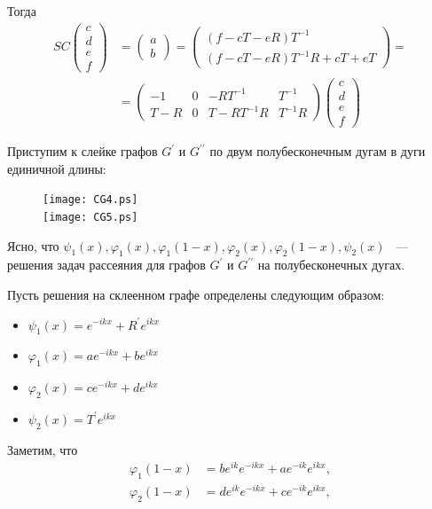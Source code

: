 \documentclass[a4 paper, 12 pt]{extarticle}
\begin{document}
   Тогда
   \[
   \begin{aligned}
   SC\left(
   \begin{array}{c}
   c \\
   d \\
   e \\
   f
   \end{array}\right) &= \left(\begin{array}{c}
   a \\
   b
   \end{array}\right) = 
   \left(\begin{array}{c}
   \left(f - cT - eR\right)T^{-1} \\
   \left(f - cT - eR\right)T^{-1}R + cT + eT
   \end{array}\right) =\\
   &= \left(\begin{array}{cccc}
   -1 & 0 & -RT^{-1} & T^{-1} \\
   T-R & 0 & T-RT^{-1}R & T^{-1}R
   \end{array}\right)
   \left(\begin{array}{c}
   c \\
   d \\
   e \\
   f
   \end{array}\right)
   \end{aligned}\]
   
   Приступим к слейке графов $G^\prime$ и $G^{\prime \prime}$ по двум полубесконечным дугам в дуги единичной длины:
   \begin{figure}[!htb]
      	\centering
      	\texttt{[image: CG4.ps]} \\
      	\texttt{[image: CG5.ps]}
   \end{figure}

   Ясно, что $\psi_1\left(x\right), \varphi_1\left(x\right), \varphi_1\left(1-x\right), \varphi_2\left(x\right), \varphi_2\left(1-x\right), \psi_2\left(x\right)$ ~--- решения задач рассеяния для графов  $G^\prime$ и $G^{\prime \prime}$ на полубесконечных дугах.
   
   Пусть решения на склеенном графе определены следующим образом:
   \begin{itemize}
   	\item $ \psi_1\left(x\right) = e^{-ikx} + R^\prime e^{ikx} $
   	\item $ \varphi_1\left(x\right)  = a e^{-ikx} + b e^{ikx} $
   	\item $ \varphi_2\left(x\right) = c e^{-ikx} + d e^{ikx} $
   	\item $ \psi_2\left(x\right) = T^\prime e^{ikx}$
   \end{itemize}
   Заметим, что
   \[
   \begin{aligned}
   \varphi_1\left(1-x\right) &= b e^{ik} e^{-ikx} + a e^{-ik} e^{ikx}, \\
   \varphi_2\left(1-x\right) &= d e^{ik} e^{-ikx} + c e^{-ik} e^{ikx},
   \end{aligned}\]
   
\end{document}
